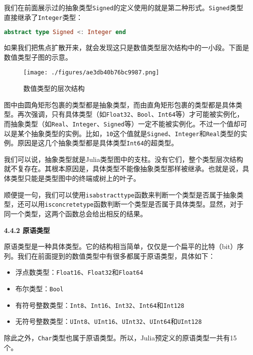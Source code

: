 我们在前面展示过的抽象类型\verb|Signed|的定义使用的就是第二种形式。\verb|Signed|类型直接继承了\verb|Integer|类型：

\begin{lstlisting}[language=julia]
abstract type Signed <: Integer end
\end{lstlisting}

如果我们把焦点扩散开来，就会发现这只是数值类型层次结构中的一小段。下面是数值类型子图的示意。

\begin{figure}[ht]
\centering
\texttt{[image: ./figures/ae3db40b76bc9987.png]}
\caption{数值类型的层次结构} \label{fig_JuC4S4_1}
\end{figure}

图中由圆角矩形包裹的类型都是抽象类型，而由直角矩形包裹的类型都是具体类型。再次强调，只有具体类型（如\verb|Float32|、\verb|Bool|、\verb|Int64|等）才可能被实例化，而抽象类型（如\verb|Real|、\verb|Integer|、\verb|Signed|等）一定不能被实例化。不过一个值却可以是某个抽象类型的实例。比如，\verb|10|这个值就是\verb|Signed|、\verb|Integer|和\verb|Real|类型的实例。原因是这几个抽象类型都是具体类型\verb|Int64|的超类型。

我们可以说，抽象类型就是Julia类型图中的支柱。没有它们，整个类型层次结构就不复存在。其根本原因是，具体类型不能像抽象类型那样被继承。也就是说，具体类型只能是类型图中的终端或树上的叶子。

顺便提一句，我们可以使用\verb|isabstracttype|函数来判断一个类型是否属于抽象类型，还可以用\verb|isconcretetype|函数判断一个类型是否属于具体类型。显然，对于同一个类型，这两个函数总会给出相反的结果。

\textbf{4.4.2 原语类型}

原语类型是一种具体类型。它的结构相当简单，仅仅是一个扁平的比特（bit）序列。我们在前面提到的数值类型中有很多都属于原语类型，具体如下：

\begin{itemize}
\item 浮点数类型：\verb|Float16|、\verb|Float32|和\verb|Float64|
\item 布尔类型：\verb|Bool|
\item 有符号整数类型：\verb|Int8|、\verb|Int16|、\verb|Int32|、\verb|Int64|和\verb|Int128|
\item 无符号整数类型：\verb|UInt8|、\verb|UInt16|、\verb|UInt32|、\verb|UInt64|和\verb|UInt128|
\end{itemize}

除此之外，\verb|Char|类型也属于原语类型。所以，Julia预定义的原语类型一共有15个。

